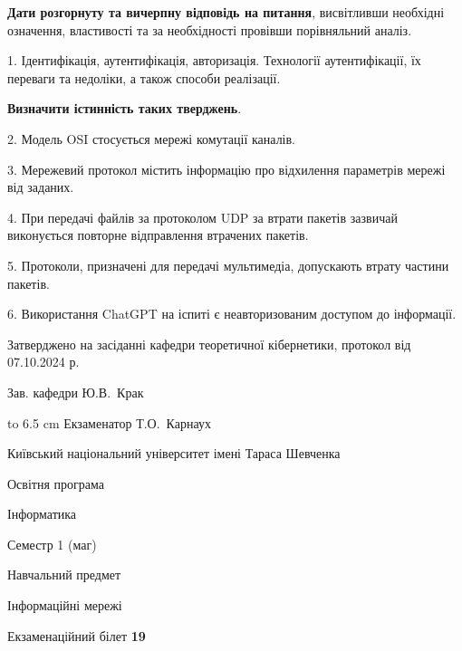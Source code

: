 \documentclass[12pt, ukrainian]{article}
\begin{document}
{
\qquad\textbf{Дати розгорнуту та вичерпну відповідь на питання}, висвітливши необхідні означення, властивості та за необхідності провівши порівняльний аналіз.

1. Ідентифікація, аутентифікація, авторизація. Технології аутентифікації, їх переваги та недоліки, а також способи реалізації.



\qquad\textbf{Визначити істинність таких тверджень}.

2. Модель OSI стосується мережі комутації каналів.


3. Мережевий протокол містить інформацію про відхилення параметрів мережі від заданих.


4. При передачі файлів за протоколом UDP за втрати пакетів зазвичай виконується повторне відправлення втрачених пакетів.


5. Протоколи, призначені для передачі мультимедіа, допускають втрату частини пакетів.


6. Використання ChatGPT на іспиті є неавторизованим доступом до інформації.

}
{\smallskip\smallskip \begin {scriptsize} Затверджено на засіданні кафедри теоретичної кібернетики, протокол   від   07.10.2024 р.\par\smallskip\smallskip\smallskip\smallskip
{\parbox {6.5 cm} {Зав. кафедри \dotfill Ю.В.~Крак}}\hspace {0.7cm} {\hbox to 6.5 cm { Екзаменатор \dotfill Т.О.~Карнаух}} \end{scriptsize}}
\newpage
{{\begin {scriptsize}\par
{ \center  Київський національний університет імені Тараса Шевченка \par}
{\parbox {5 cm}{Освітня програма \hfill}{\parbox {7 cm}{Інформатика\hfill}}\parbox {6 cm}{\hfill Семестр 1 (маг)}}\par
{\parbox {5 cm} {Навчальний предмет \hfill}\parbox {7 cm}{Інформаційні мережі \hfill}\parbox {6cm}{\hfill}\par}\vspace{-15pt} \end{scriptsize}}{\center Екзаменаційний білет \No \textbf { 19 }\par}}
\end{document}
